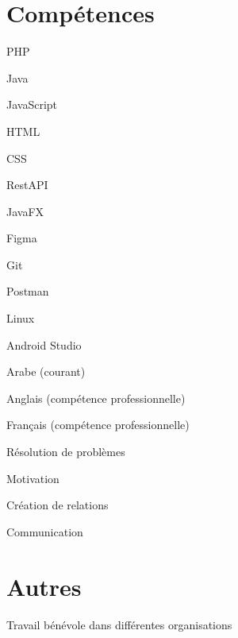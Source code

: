 \documentclass[]{deedy-resume-openfont}
\begin{document}
%
%
\section{Compétences}

\begin{enumerate*}
  \item[]  PHP
  \item[]  Java
  \item[]  JavaScript
  \item[]  HTML
  \item[]  CSS
  \item[]  RestAPI
\end{enumerate*}
\linebreak
\linebreak

\begin{enumerate*}
  \item[]  JavaFX
  \item[]  Figma
  \item[]  Git
  \item[]  Postman
  \item[]  Linux
  \item[]  Android Studio
\end{enumerate*}
\linebreak
\linebreak

\begin{enumerate*}
  \item[]  Arabe (courant)
  \item[]  Anglais (compétence professionnelle)
  \item[]  Français (compétence professionnelle)
\end{enumerate*}
\linebreak
\linebreak

\begin{enumerate*}
  \item[]  Résolution de problèmes  
  \item[]  Motivation 
  \item[]  Création de relations 
  \item[]  Communication
\end{enumerate*}

%
%
\section{Autres}
Travail bénévole dans différentes organisations\\
\sectionsep
\ 
\end{document}
